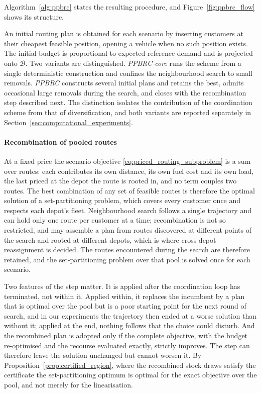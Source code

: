 \documentclass[authoryear,final,3p,times]{elsarticle}
\theoremstyle{definition}
\theoremstyle{plain}
\begin{document}
Algorithm~\ref{alg:ppbrc} states the resulting procedure, and
Figure~\ref{fig:ppbrc_flow} shows its structure.

An initial routing plan is obtained for each scenario by inserting customers at their cheapest feasible position, opening a vehicle when no such position exists. The initial budget is proportional to expected reference demand and is projected onto $\mathcal B$. Two variants are distinguished. \emph{PPBRC-core} runs the scheme from a single deterministic construction and confines the neighbourhood search to small removals. \emph{PPBRC} constructs several initial plans and retains the best, admits occasional large removals during the search, and closes with the recombination step described next. The distinction isolates the contribution of the coordination scheme from that of diversification, and both variants are reported separately in Section~\ref{sec:computational_experiments}.

\paragraph{Recombination of pooled routes}
At a fixed price the scenario objective \eqref{eq:priced_routing_subproblem}
is a sum over routes: each contributes its own distance, its own fuel cost and
its own load, the last priced at the depot the route is rooted in, and no term
couples two routes. The best
combination of any set of feasible routes is therefore the optimal solution of
a set-partitioning problem, which covers every customer once and respects each
depot's fleet. Neighbourhood search follows a single trajectory and can hold
only one route per customer at a time; recombination is not so restricted, and
may assemble a plan from routes discovered at different points of the search
and rooted at different depots, which is where cross-depot reassignment is
decided. The routes encountered during the search are therefore retained, and
the set-partitioning problem over that pool is solved once for each scenario.

Two features of the step matter. It is applied after the coordination loop has
terminated, not within it. Applied within, it replaces the incumbent by a plan
that is optimal over the pool but is a poor starting point for the next round
of search, and in our experiments the trajectory then ended at a worse
solution than without it; applied at the end, nothing follows that the choice
could disturb. And the recombined plan is adopted only if the complete
objective, with the budget re-optimised and the recourse evaluated exactly,
strictly improves. The step can therefore leave the solution unchanged but
cannot worsen it. By Proposition~\ref{prop:certified_region}, where the
recombined stock draws satisfy the certificate the set-partitioning optimum is
optimal for the exact objective over the pool, and not merely for the
linearisation.
\end{document}

